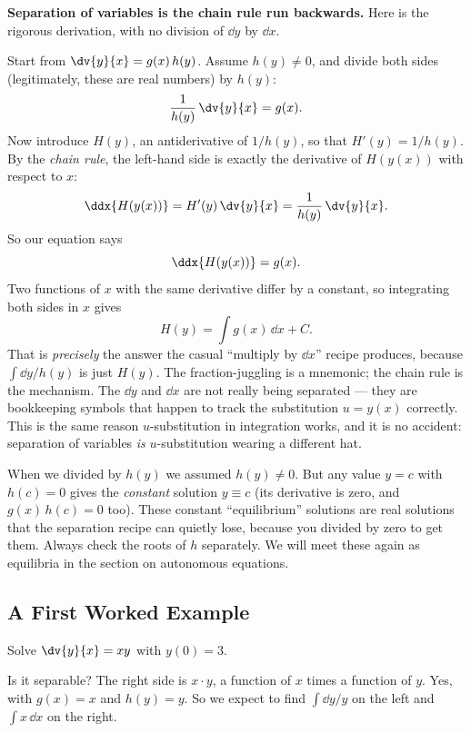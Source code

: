 \begin{whybox}
\textbf{Separation of variables is the chain rule run backwards.} Here is the
rigorous derivation, with no division of $\dd y$ by $\dd x$.

Start from $\dv{y}{x}=g(x)\,h(y)$. Assume $h(y)\neq 0$, and divide both sides
(legitimately, these are real numbers) by $h(y)$:
\[
  \frac{1}{h(y)}\,\dv{y}{x} = g(x).
\]
Now introduce $H(y)$, an antiderivative of $1/h(y)$, so that $H'(y)=1/h(y)$. By the
\emph{chain rule}, the left-hand side is exactly the derivative of $H(y(x))$ with
respect to $x$:
\[
  \ddx{H(y(x))} = H'(y)\,\dv{y}{x} = \frac{1}{h(y)}\,\dv{y}{x}.
\]
So our equation says
\[
  \ddx{H(y(x))} = g(x).
\]
Two functions of $x$ with the same derivative differ by a constant, so integrating
both sides in $x$ gives
\[
  H(y) = \int g(x)\,\dd x + C.
\]
That is \emph{precisely} the answer the casual ``multiply by $\dd x$'' recipe
produces, because $\int \dd y / h(y)$ is just $H(y)$. The fraction-juggling is a
mnemonic; the chain rule is the mechanism. The $\dd y$ and $\dd x$ are not really
being separated --- they are bookkeeping symbols that happen to track the
substitution $u=y(x)$ correctly. This is the same reason $u$-substitution in
integration works, and it is no accident: separation of variables \emph{is}
$u$-substitution wearing a different hat.
\end{whybox}

\begin{trapbox}
When we divided by $h(y)$ we assumed $h(y)\neq 0$. But any value $y=c$ with
$h(c)=0$ gives the \emph{constant} solution $y\equiv c$ (its derivative is zero, and
$g(x)\,h(c)=0$ too). These constant ``equilibrium'' solutions are real solutions
that the separation recipe can quietly lose, because you divided by zero to get
them. Always check the roots of $h$ separately. We will meet these again as
equilibria in the section on autonomous equations.
\end{trapbox}

\subsection{A First Worked Example}

Solve $\dv{y}{x} = xy$ with $y(0)=3$.

\begin{walkbox}
Is it separable? The right side is $x \cdot y$, a function of $x$ times a function
of $y$. Yes, with $g(x)=x$ and $h(y)=y$. So we expect to find $\int \dd y/y$ on the
left and $\int x\,\dd x$ on the right.
\end{walkbox}

